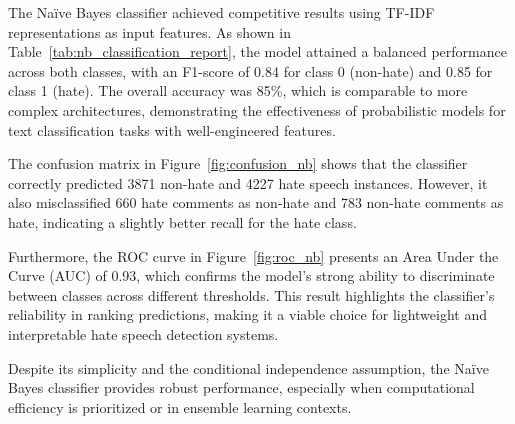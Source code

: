 The Naïve Bayes classifier achieved competitive results using TF-IDF representations as input features. As shown in Table~\ref{tab:nb_classification_report}, the model attained a balanced performance across both classes, with an F1-score of 0.84 for class 0 (non-hate) and 0.85 for class 1 (hate). The overall accuracy was 85\%, which is comparable to more complex architectures, demonstrating the effectiveness of probabilistic models for text classification tasks with well-engineered features.

The confusion matrix in Figure~\ref{fig:confusion_nb} shows that the classifier correctly predicted 3871 non-hate and 4227 hate speech instances. However, it also misclassified 660 hate comments as non-hate and 783 non-hate comments as hate, indicating a slightly better recall for the hate class.

Furthermore, the ROC curve in Figure~\ref{fig:roc_nb} presents an Area Under the Curve (AUC) of 0.93, which confirms the model’s strong ability to discriminate between classes across different thresholds. This result highlights the classifier’s reliability in ranking predictions, making it a viable choice for lightweight and interpretable hate speech detection systems.

Despite its simplicity and the conditional independence assumption, the Naïve Bayes classifier provides robust performance, especially when computational efficiency is prioritized or in ensemble learning contexts.
